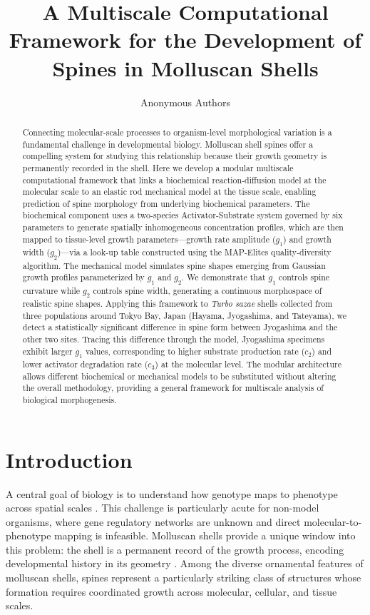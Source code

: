 \documentclass[11pt]{article}
\title{A Multiscale Computational Framework for the Development of Spines in Molluscan Shells}
\author{Anonymous Authors}
\date{}
\begin{document}
\maketitle

\begin{abstract}
Connecting molecular-scale processes to organism-level morphological variation is a fundamental challenge in developmental biology. Molluscan shell spines offer a compelling system for studying this relationship because their growth geometry is permanently recorded in the shell. Here we develop a modular multiscale computational framework that links a biochemical reaction-diffusion model at the molecular scale to an elastic rod mechanical model at the tissue scale, enabling prediction of spine morphology from underlying biochemical parameters. The biochemical component uses a two-species Activator-Substrate system governed by six parameters to generate spatially inhomogeneous concentration profiles, which are then mapped to tissue-level growth parameters---growth rate amplitude ($g_1$) and growth width ($g_2$)---via a look-up table constructed using the MAP-Elites quality-diversity algorithm. The mechanical model simulates spine shapes emerging from Gaussian growth profiles parameterized by $g_1$ and $g_2$. We demonstrate that $g_1$ controls spine curvature while $g_2$ controls spine width, generating a continuous morphospace of realistic spine shapes. Applying this framework to \textit{Turbo sazae} shells collected from three populations around Tokyo Bay, Japan (Hayama, Jyogashima, and Tateyama), we detect a statistically significant difference in spine form between Jyogashima and the other two sites. Tracing this difference through the model, Jyogashima specimens exhibit larger $g_1$ values, corresponding to higher substrate production rate ($c_2$) and lower activator degradation rate ($c_3$) at the molecular level. The modular architecture allows different biochemical or mechanical models to be substituted without altering the overall methodology, providing a general framework for multiscale analysis of biological morphogenesis.
\end{abstract}

\section{Introduction}

A central goal of biology is to understand how genotype maps to phenotype across spatial scales \citep{thompson1917,green2015}. This challenge is particularly acute for non-model organisms, where gene regulatory networks are unknown and direct molecular-to-phenotype mapping is infeasible. Molluscan shells provide a unique window into this problem: the shell is a permanent record of the growth process, encoding developmental history in its geometry \citep{raup1966,meinhardt2009}. Among the diverse ornamental features of molluscan shells, spines represent a particularly striking class of structures whose formation requires coordinated growth across molecular, cellular, and tissue scales.
\end{document}

